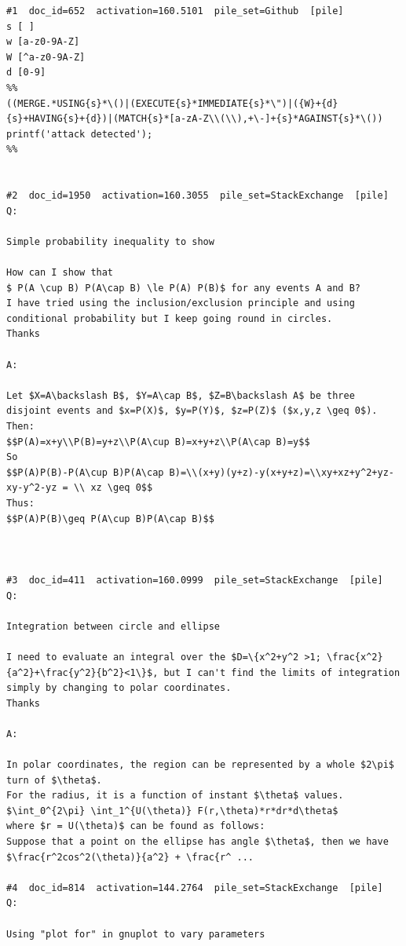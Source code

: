 \begin{verbatim}
#1  doc_id=652  activation=160.5101  pile_set=Github  [pile]
s [ ]
w [a-z0-9A-Z]
W [^a-z0-9A-Z]
d [0-9]
%%
((MERGE.*USING{s}*\()|(EXECUTE{s}*IMMEDIATE{s}*\")|({W}+{d}{s}+HAVING{s}+{d})|(MATCH{s}*[a-zA-Z\\(\\),+\-]+{s}*AGAINST{s}*\()) printf('attack detected');
%%


#2  doc_id=1950  activation=160.3055  pile_set=StackExchange  [pile]
Q:

Simple probability inequality to show

How can I show that 
$ P(A \cup B) P(A\cap B) \le P(A) P(B)$ for any events A and B?
I have tried using the inclusion/exclusion principle and using conditional probability but I keep going round in circles.
Thanks

A:

Let $X=A\backslash B$, $Y=A\cap B$, $Z=B\backslash A$ be three disjoint events and $x=P(X)$, $y=P(Y)$, $z=P(Z)$ ($x,y,z \geq 0$). 
Then:
$$P(A)=x+y\\P(B)=y+z\\P(A\cup B)=x+y+z\\P(A\cap B)=y$$
So
$$P(A)P(B)-P(A\cup B)P(A\cap B)=\\(x+y)(y+z)-y(x+y+z)=\\xy+xz+y^2+yz-xy-y^2-yz = \\ xz \geq 0$$
Thus:
$$P(A)P(B)\geq P(A\cup B)P(A\cap B)$$



#3  doc_id=411  activation=160.0999  pile_set=StackExchange  [pile]
Q:

Integration between circle and ellipse

I need to evaluate an integral over the $D=\{x^2+y^2 >1; \frac{x^2}{a^2}+\frac{y^2}{b^2}<1\}$, but I can't find the limits of integration simply by changing to polar coordinates.
Thanks

A:

In polar coordinates, the region can be represented by a whole $2\pi$ turn of $\theta$.
For the radius, it is a function of instant $\theta$ values.
$\int_0^{2\pi} \int_1^{U(\theta)} F(r,\theta)*r*dr*d\theta$
where $r = U(\theta)$ can be found as follows:
Suppose that a point on the ellipse has angle $\theta$, then we have $\frac{r^2cos^2(\theta)}{a^2} + \frac{r^ ...

#4  doc_id=814  activation=144.2764  pile_set=StackExchange  [pile]
Q:

Using "plot for" in gnuplot to vary parameters


\end{verbatim}
